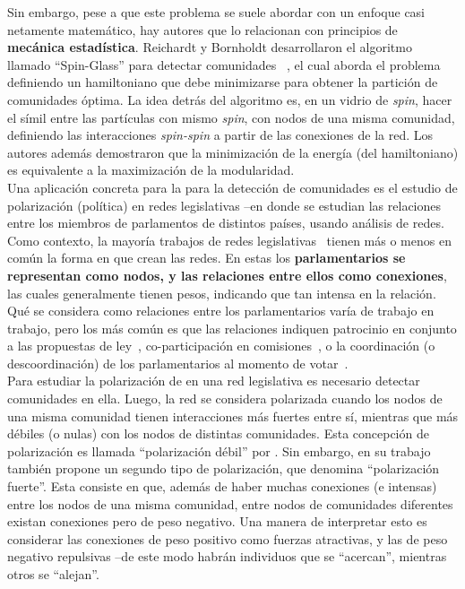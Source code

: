 \documentclass{proyectotesis}
\begin{document}
Sin embargo, pese a que este problema se suele abordar con un enfoque casi netamente matemático, hay autores que lo relacionan con principios de \textbf{mecánica estadística}. Reichardt y Bornholdt desarrollaron el algoritmo llamado ``Spin-Glass'' para detectar comunidades ~\cite{reichardt_statistical_2006}, el cual aborda el problema definiendo un hamiltoniano que debe minimizarse para obtener la partición de comunidades óptima. La idea detrás del algoritmo es, en un vidrio de \textit{spin}, hacer el símil entre las partículas con mismo \textit{spin}, con nodos de una misma comunidad, definiendo las interacciones \textit{spin-spin} a partir de las conexiones de la red. Los autores además demostraron que la minimización de la energía (del hamiltoniano) es equivalente a la maximización de la modularidad.\\

Una aplicación concreta para la para la detección de comunidades es el estudio de polarización (política) en redes legislativas --en donde se estudian las relaciones entre los miembros de  parlamentos de distintos países, usando análisis de redes.\\

Como contexto, la mayoría trabajos de redes legislativas~\cite{neal_sign_2020, marenco_time_2020, intal_dissent_2021, schoch_legislators_2020, aleman_explaining_2013, zhang_community_2007, fowler_connecting_2007, porter_network_2005, andris_rise_2015, briatte_network_2016, le_foulon_moran_cooperation_2020}
tienen más o menos en común la forma en que crean las redes. En estas los \textbf{parlamentarios se representan como nodos, y las relaciones entre ellos como conexiones}, las cuales generalmente tienen pesos, indicando que tan intensa en la relación. Qué se considera como relaciones entre los parlamentarios varía de trabajo en trabajo, pero los más común es que las relaciones indiquen patrocinio en conjunto a las propuestas de ley~\cite{neal_sign_2020, zhang_community_2007, le_foulon_moran_cooperation_2020,fowler_connecting_2007}, co-participación en comisiones~\cite{porter_network_2005}, o la coordinación (o descoordinación) de los parlamentarios al momento de votar~\cite{andris_rise_2015, marenco_time_2020, schoch_legislators_2020, intal_dissent_2021}.\\

Para estudiar la polarización de en una red legislativa es necesario detectar comunidades en ella. Luego, la red se considera polarizada cuando los nodos de una misma comunidad tienen interacciones más fuertes entre sí, mientras que más débiles (o nulas) con los nodos de distintas comunidades. Esta concepción de polarización es llamada ``polarización débil'' por \citet{neal_sign_2020}. Sin embargo, en su trabajo también propone un segundo tipo de polarización, que denomina ``polarización fuerte''. Esta consiste en que, además de haber muchas conexiones (e intensas) entre los nodos de una misma comunidad, entre nodos de comunidades diferentes existan conexiones pero de peso negativo. Una manera de interpretar esto es considerar las conexiones de peso positivo como fuerzas atractivas, y las de peso negativo repulsivas --de este modo habrán individuos que se ``acercan'', mientras otros se ``alejan''.\\
\end{document}
